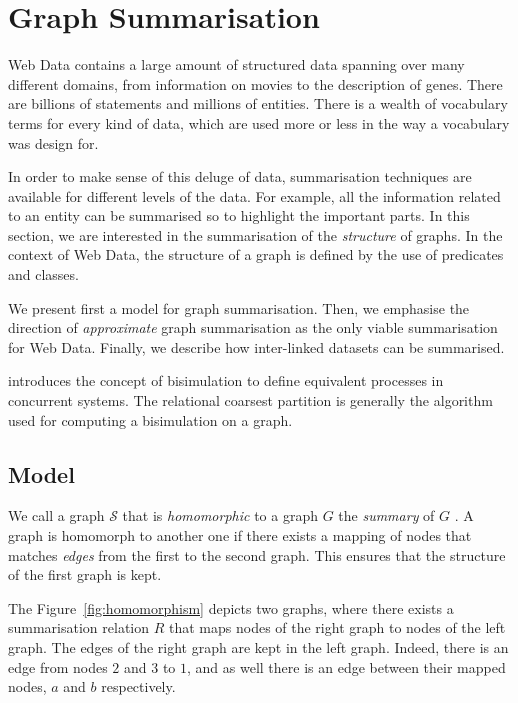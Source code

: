 \section{Graph Summarisation}
\label{chap:summary:model}

Web Data contains a large amount of structured data spanning over many different domains, from information on movies to the description of genes. There are billions of statements and millions of entities. There is a wealth of vocabulary terms for every kind of data, which are used more or less in the way a vocabulary was design for.

In order to make sense of this deluge of data, summarisation techniques are available for different levels of the data. For example, all the information related to an entity can be summarised so to highlight the important parts. In this section, we are interested in the summarisation of the \emph{structure} of graphs. In the context of Web Data, the structure of a graph is defined by the use of predicates and classes.

We present first a model for graph summarisation. Then, we emphasise the direction of \emph{approximate} graph summarisation as the only viable summarisation for Web Data. Finally, we describe how inter-linked datasets can be summarised.

\cite{Milner:1989:CC:534666} introduces the concept of bisimulation to define equivalent processes in concurrent systems. The relational coarsest partition \cite{Paige:1987:TPR:37185.37186} is generally the algorithm used for computing a bisimulation on a graph.

\subsection{Model}

We call a graph $\mathcal{S}$ that is \emph{homomorphic} to a graph $G$ the \emph{summary} of $G$ \cite{campinas:2012:dexa}.
A graph is homomorph to another one if there exists a mapping of nodes that matches \emph{edges} from the first to the second graph. This ensures that the structure of the first graph is kept.

The Figure~\ref{fig:homomorphism} depicts two graphs, where there exists a summarisation relation $R$ that maps nodes of the right graph to nodes of the left graph. The edges of the right graph are kept in the left graph. Indeed, there is an edge from nodes $2$ and $3$ to $1$, and as well there is an edge between their mapped nodes, $a$ and $b$ respectively.\\


